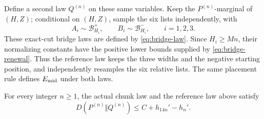 

Define a second law \(Q^{(n)}\) on these same variables.  Keep the
\(P^{(n)}\)-marginal of \((H,Z)\); conditional on \((H,Z)\), sample the
six lists independently, with
\[
 A_i\sim\mathcal B_{H_i}^+,
 \qquad B_i\sim\mathcal B_{H_i}^-,
 \qquad i=1,2,3.
\]
These exact-cut bridge laws are defined by \eqref{eq:bridge-law}.
Since \(H_i\ge Mn\), their normalizing constants have the positive lower
bounds supplied by \eqref{eq:bridge-renewal}.
Thus the reference law keeps the three widths and the negative starting
position, and independently resamples the six relative lists.  The same
placement rule defines \(E_{\rm mid}\) under both laws.

\begin{proposition}\label{prop:entropy-comparison}
For every integer \(n\ge1\), the actual chunk law and the reference law
above satisfy
\begin{equation}
 D(P^{(n)}\Vert Q^{(n)})\le C+h_{14n}'-h_n'.
 \label{eq:entropy-comparison}
\end{equation}
\end{proposition}

